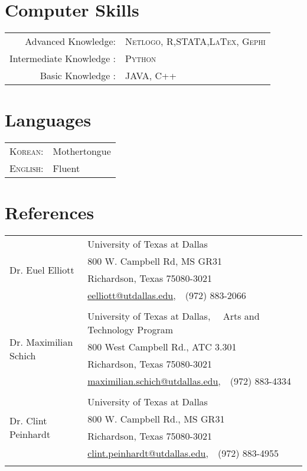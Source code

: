 \documentclass[a4paper,10pt]{article}
\begin{document}


 


\section{Computer Skills}
\begin{tabular}{rl}
Advanced Knowledge: & \textsc{Netlogo}, \textsc{R},\textsc{STATA},\textsc{LaTex}, \textsc{Gephi}\\ 
 
Intermediate Knowledge :  & \textsc{Python} \\
Basic Knowledge : & \textsc{JAVA}, \textsc{C++} \\

\end{tabular}



\section{Languages}
\begin{tabular}{rl}
 \textsc{Korean:}&Mothertongue\\
\textsc{English:}&Fluent\\

\end{tabular}

\section{References}
\begin{tabular}{ll}
 \multirow{4}{*}{Dr. Euel Elliott} & University of Texas at Dallas \\ 
& 800 W. Campbell Rd, MS GR31\\
& Richardson, Texas 75080-3021\\
& \href{mailto:eelliott@utdallas.edu}{eelliott@utdallas.edu},~~(972) 883-2066\\
&\\

\multirow{4}{*}{Dr. Maximilian Schich} & University of Texas at Dallas, ~~Arts and Technology Program\\
&800 West Campbell Rd., ATC 3.301\\
&Richardson, Texas 75080-3021 \\ 
& \href{mailto:maximilian.schich@utdallas.edu}{maximilian.schich@utdallas.edu},~~(972) 883-4334\\
&\\


\multirow{4}{*}{Dr. Clint Peinhardt} & University of Texas at Dallas \\ 
& 800 W. Campbell Rd., MS GR31\\
& Richardson, Texas 75080-3021\\
& \href{mailto:clint.peinhardt@utdallas.edu}{clint.peinhardt@utdallas.edu},~~(972) 883-4955\\
&\\
\hline
\end{tabular}
\end{document}
